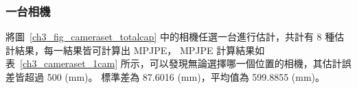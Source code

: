 \subsubsection{一台相機}
將圖~\ref{ch3_fig_cameraset_totalcap} 中的相機任選一台進行估計，共計有 8 種估計結果，每一結果皆可計算出 MPJPE，
MPJPE 計算結果如表~\ref{ch3_cameraset_1cam} 所示，可以發現無論選擇哪一個位置的相機，其估計誤差皆超過 500 (mm)。
標準差為 87.6016 (mm)，平均值為 599.8855 (mm)。
\begin{table}[!ht]
   \caption[一台相機組合與其估計結果誤差]{一台相機組合與其估計結果誤差}
   \centering
   \label{ch3_cameraset_1cam}
   \setlength{\tabcolsep}{3pt}
   \renewcommand\arraystretch{1.5}
\end{table}
\clearpage

